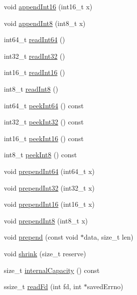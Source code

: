 \begin{DoxyCompactItemize}
\item 
void \hyperlink{classmuduo_1_1net_1_1Buffer_a4d4daf38d824d3773fa5d711ffd536e1}{append\+Int16} (int16\+\_\+t x)
\item 
void \hyperlink{classmuduo_1_1net_1_1Buffer_a9dca0171bcc73c002095487c464bad28}{append\+Int8} (int8\+\_\+t x)
\item 
int64\+\_\+t \hyperlink{classmuduo_1_1net_1_1Buffer_a5b815d6984b81ae01f581f799c48582f}{read\+Int64} ()
\item 
int32\+\_\+t \hyperlink{classmuduo_1_1net_1_1Buffer_adbc23fa2b53ee3f0bd8cc0af521900d4}{read\+Int32} ()
\item 
int16\+\_\+t \hyperlink{classmuduo_1_1net_1_1Buffer_a7cf018b7a5d7bed8aa4d201e4399fce0}{read\+Int16} ()
\item 
int8\+\_\+t \hyperlink{classmuduo_1_1net_1_1Buffer_a24c9f312341ccfb47ae7a007ae32c39f}{read\+Int8} ()
\item 
int64\+\_\+t \hyperlink{classmuduo_1_1net_1_1Buffer_a78f18c2f695bc9fb75781596a16d9416}{peek\+Int64} () const
\item 
int32\+\_\+t \hyperlink{classmuduo_1_1net_1_1Buffer_afefe12caa1ed837ffb7e967d44e19af9}{peek\+Int32} () const
\item 
int16\+\_\+t \hyperlink{classmuduo_1_1net_1_1Buffer_af9c96d31bad4ac1ff73d31672bc324c3}{peek\+Int16} () const
\item 
int8\+\_\+t \hyperlink{classmuduo_1_1net_1_1Buffer_a28a767d788ebbb53bef6c939cfa8b5fb}{peek\+Int8} () const
\item 
void \hyperlink{classmuduo_1_1net_1_1Buffer_a1c260d8fb7c6194ce8ca9859718239d3}{prepend\+Int64} (int64\+\_\+t x)
\item 
void \hyperlink{classmuduo_1_1net_1_1Buffer_a280f25c26e5867377de5c0c31dbc06c1}{prepend\+Int32} (int32\+\_\+t x)
\item 
void \hyperlink{classmuduo_1_1net_1_1Buffer_a1c47f5d97958f529ef78f0ba283e33d0}{prepend\+Int16} (int16\+\_\+t x)
\item 
void \hyperlink{classmuduo_1_1net_1_1Buffer_aa9b0f2527792514135d94b7f141f4039}{prepend\+Int8} (int8\+\_\+t x)
\item 
void \hyperlink{classmuduo_1_1net_1_1Buffer_a3099092e4d4138f55fb825a50f50f24b}{prepend} (const void $\ast$data, size\+\_\+t len)
\item 
void \hyperlink{classmuduo_1_1net_1_1Buffer_a69095875ff26fe7eff163afde6eb7c9e}{shrink} (size\+\_\+t reserve)
\item 
size\+\_\+t \hyperlink{classmuduo_1_1net_1_1Buffer_add5064782687c36289ea4905a58caef2}{internal\+Capacity} () const
\item 
ssize\+\_\+t \hyperlink{classmuduo_1_1net_1_1Buffer_abf4ee68d9e5290cdfb7f3854387f0576}{read\+Fd} (int fd, int $\ast$saved\+Errno)
\end{DoxyCompactItemize}
